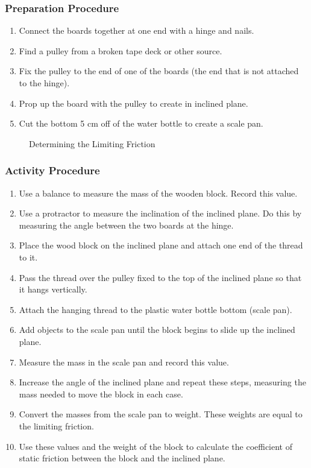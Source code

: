 \subsubsection*{Preparation Procedure}
\begin{enumerate}
\item{Connect the boards together at one end with a hinge and nails.} 
\item{Find a pulley from a broken tape deck or other source.} 
\item{Fix the pulley to the end of one of the boards (the end that is not attached to the hinge).} 
\item{Prop up the board with the pulley to create in inclined plane.} 
\item{Cut the bottom 5 cm off of the water bottle to create a scale pan.} 
\end{enumerate}

\begin{figure}[h]
\begin{center}
\def\svgwidth{150pt}

\caption{Determining the Limiting Friction}
\label{fig:limiting-friction}
\end{center}
\end{figure}

\subsubsection*{Activity Procedure}
\begin{enumerate}
\item{Use a balance to measure the mass of the wooden block. Record this value.} 
\item{Use a protractor to measure the inclination of the inclined plane. Do this by measuring the angle between the two boards at the hinge.} 
\item{Place the wood block on the inclined plane and attach one end of the thread to it.} 
\item{Pass the thread over the pulley fixed to the top of the inclined plane so that it hangs vertically.} 
\item{Attach the hanging thread to the plastic water bottle bottom (scale pan).} 
\item{Add objects to the scale pan until the block begins to slide up the inclined plane.} 
\item{Measure the mass in the scale pan and record this value.} 
\item{Increase the angle of the inclined plane and repeat these steps, measuring the mass needed to move the block in each case.} 
\item{Convert the masses from the scale pan to weight. These weights are equal to the limiting friction.} 
\item{Use these values and the weight of the block to calculate the coefficient of static friction between the block and the inclined plane.} 
\end{enumerate}

